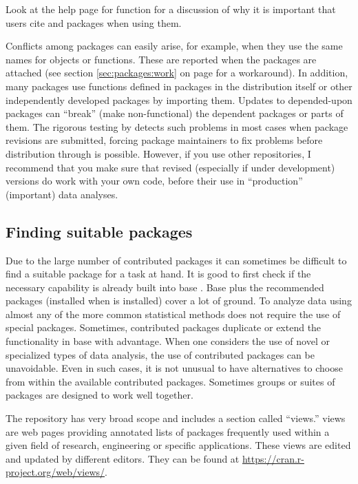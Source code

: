 \documentclass[krantz2]{krantz}\usepackage{knitr}
\begin{document}
\begin{playground}
  Look at the help page for function  for a discussion of why it is important that users cite \Rpgrm and packages when using them.
\end{playground}

\begin{warningbox}
Conflicts among packages can easily arise, for example, when they use the same names for objects or functions. These are reported when the packages are attached (see section \ref{sec:packages:work} on page \pageref{sec:packages:work} for a workaround). In addition, many packages use functions defined in packages in the \Rlang distribution itself or other independently developed packages by importing them. Updates to depended-upon packages can ``break'' (make non-functional) the dependent packages or parts of them. The rigorous testing by \CRAN detects such problems in most cases when package revisions are submitted, forcing package maintainers to fix problems before distribution through \CRAN is possible. However, if you use other repositories, I recommend that you make sure that revised (especially if under development) versions do work with your own code, before their use in ``production'' (important) data analyses.
\end{warningbox}

\subsection{Finding suitable packages}

Due to the large number of contributed \Rlang packages it can sometimes be difficult to find a suitable package for a task at hand. It is good to first check if the necessary capability is already built into base \Rlang. Base \Rlang plus the recommended packages (installed when \Rlang is installed) cover a lot of ground. To analyze data using almost any of the more common statistical methods does not require the use of special packages. Sometimes, contributed packages duplicate or extend the functionality in base \Rlang with advantage. When one considers the use of novel or specialized types of data analysis, the use of contributed packages can be unavoidable. Even in such cases, it is not unusual to have alternatives to choose from within the available contributed packages. Sometimes groups or suites of packages are designed to work well together.

The \CRAN repository has very broad scope and includes a section called ``views.'' \Rlang views are web pages providing annotated lists of packages frequently used within a given field of research, engineering or specific applications. These views are edited and updated by different editors. They can be found at \url{https://cran.r-project.org/web/views/}.
\end{document}
